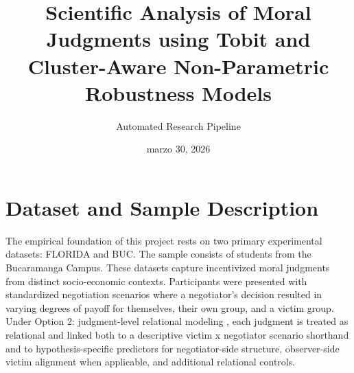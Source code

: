 \documentclass[11pt]{article}
\title{Scientific Analysis of Moral Judgments using Tobit and Cluster-Aware Non-Parametric Robustness Models}
\author{Automated Research Pipeline}
\date{marzo 30, 2026}
\begin{document}
\maketitle

\section{Dataset and Sample Description}
The empirical foundation of this project rests on two primary experimental datasets: FLORIDA and BUC.  The sample consists of students from the Bucaramanga Campus.  These datasets capture incentivized moral judgments from distinct socio-economic contexts. Participants were presented  with standardized negotiation scenarios where a negotiator's decision resulted in varying degrees of payoff for  themselves, their own group, and a victim group. Under  Option 2: judgment-level relational modeling , each judgment is treated as relational and linked both to a descriptive victim x negotiator scenario shorthand and to hypothesis-specific predictors for negotiator-side structure, observer-side victim alignment when applicable, and additional relational controls.
\end{document}
